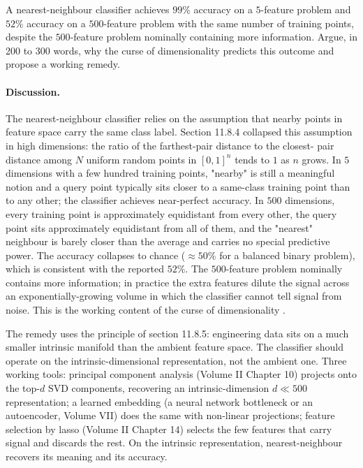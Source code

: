 \begin{exercise}
A nearest-neighbour classifier achieves $99\%$ accuracy on a
$5$-feature problem and $52\%$ accuracy on a $500$-feature
problem with the same number of training points, despite the
$500$-feature problem nominally containing more information.
Argue, in 200 to 300 words, why the curse of dimensionality
predicts this outcome and propose a working remedy.

\paragraph{Discussion.} The nearest-neighbour classifier relies on
the assumption that nearby points in feature space carry the same
class label. Section 11.8.4 collapsed this assumption in high
dimensions: the ratio of the farthest-pair distance to the closest-
pair distance among $N$ uniform random points in $[0, 1]^{n}$ tends
to $1$ as $n$ grows. In $5$ dimensions with a few hundred training
points, "nearby" is still a meaningful notion and a query point
typically sits closer to a same-class training point than to any
other; the classifier achieves near-perfect accuracy. In $500$
dimensions, every training point is approximately equidistant from
every other, the query point sits approximately equidistant from
all of them, and the "nearest" neighbour is barely closer than the
average and carries no special predictive power. The accuracy
collapses to chance ($\approx 50\%$ for a balanced binary problem),
which is consistent with the reported $52\%$. The $500$-feature
problem nominally contains more information; in practice the
extra features dilute the signal across an exponentially-growing
volume in which the classifier cannot tell signal from noise. This
is the working content of the curse of dimensionality
\cite{paper:v2ch11-blum-curse-1997}.

The remedy uses the principle of section 11.8.5: engineering data
sits on a much smaller intrinsic manifold than the ambient feature
space. The classifier should operate on the intrinsic-dimensional
representation, not the ambient one. Three working tools: principal
component analysis (Volume II Chapter 10) projects onto the top-$d$
SVD components, recovering an intrinsic-dimension $d \ll 500$
representation; a learned embedding (a neural network bottleneck or
an autoencoder, Volume VII) does the same with non-linear
projections; feature selection by lasso (Volume II Chapter 14)
selects the few features that carry signal and discards the rest.
On the intrinsic representation, nearest-neighbour recovers its
meaning and its accuracy.
\end{exercise}

